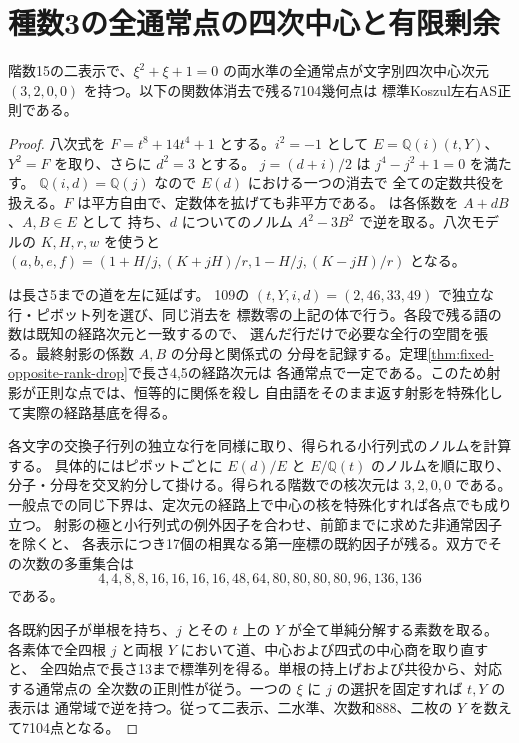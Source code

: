 \section{種数3の全通常点の四次中心と有限剰余}
\label{sec:rank-fifteen-octic-center}
\begin{theorem}\label{thm:rank-fifteen-octic-center}
階数15の二表示で、$\xi^2+\xi+1=0$ の両水準の全通常点が文字別四次中心次元
$(3,2,0,0)$ を持つ。以下の関数体消去で残る7104幾何点は
標準Koszul左右AS正則である。
\end{theorem}
\begin{proof}
八次式を $F=t^8+14t^4+1$ とする。$i^2=-1$ として
$E=\mathbb Q(i)(t,Y)$、$Y^2=F$ を取り、さらに $d^2=3$ とする。
$j=(d+i)/2$ は $j^4-j^2+1=0$ を満たす。
$\mathbb Q(i,d)=\mathbb Q(j)$ なので $E(d)$ における一つの消去で
全ての定数共役を扱える。$F$ は平方自由で、定数体を拡げても非平方である。
 は各係数を $A+dB$、$A,B\in E$ として
持ち、$d$ についてのノルム $A^2-3B^2$ で逆を取る。八次モデルの $K,H,r,w$ を使うと
$(a,b,e,f)=(1+H/j,(K+jH)/r,1-H/j,(K-jH)/r)$ となる。

 は長さ5までの道を左に延ばす。
109の $(t,Y,i,d)=(2,46,33,49)$ で独立な行・ピボット列を選び、同じ消去を
標数零の上記の体で行う。各段で残る語の数は既知の経路次元と一致するので、
選んだ行だけで必要な全行の空間を張る。最終射影の係数 $A,B$ の分母と関係式の
分母を記録する。定理\ref{thm:fixed-opposite-rank-drop}で長さ4,5の経路次元は
各通常点で一定である。このため射影が正則な点では、恒等的に関係を殺し
自由語をそのまま返す射影を特殊化して実際の経路基底を得る。

各文字の交換子行列の独立な行を同様に取り、得られる小行列式のノルムを計算する。
具体的にはピボットごとに $E(d)/E$ と $E/\mathbb Q(t)$ のノルムを順に取り、
分子・分母を交叉約分して掛ける。得られる階数での核次元は $3,2,0,0$ である。
一般点での同じ下界は、定次元の経路上で中心の核を特殊化すれば各点でも成り立つ。
射影の極と小行列式の例外因子を合わせ、前節までに求めた非通常因子を除くと、
各表示につき17個の相異なる第一座標の既約因子が残る。双方でその次数の多重集合は
\[
 4,4,8,8,16,16,16,16,48,64,80,80,80,80,96,136,136
\]
である。

各既約因子が単根を持ち、$j$ とその $t$ 上の $Y$ が全て単純分解する素数を取る。
各素体で全四根 $j$ と両根 $Y$ において道、中心および四式の中心商を取り直すと、
全四始点で長さ13まで標準列を得る。単根の持上げおよび共役から、対応する通常点の
全次数の正則性が従う。一つの $\xi$ に $j$ の選択を固定すれば $t,Y$ の表示は
通常域で逆を持つ。従って二表示、二水準、次数和888、二枚の $Y$ を数えて7104点となる。
\end{proof}


